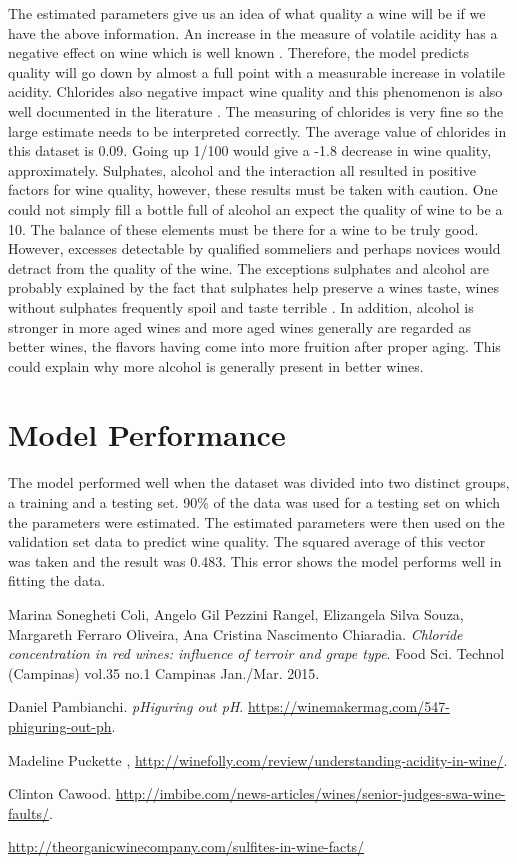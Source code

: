 \documentclass[]{article}
\begin{document}
The estimated parameters give us an idea of what quality a wine will be if we have the above information. An increase in the measure of volatile acidity has a negative effect on wine which is well known \cite{imbibe}. Therefore, the model predicts quality will go down by almost a full point with a measurable increase in volatile acidity. Chlorides also negative impact wine quality and this phenomenon is also well documented in the literature \cite{winSite}. The measuring of chlorides is very fine so the large estimate needs to be interpreted correctly. The average value of chlorides in this dataset is 0.09. Going up 1/100 would give a -1.8 decrease in wine quality, approximately. Sulphates, alcohol and the interaction all resulted in positive factors for wine quality, however, these results must be taken with caution. One could not simply fill a bottle full of alcohol an expect the quality of wine to be a 10. The balance of these elements must be there for a wine to be truly good. However, excesses detectable by qualified sommeliers and perhaps novices would detract from the quality of the wine. The exceptions sulphates and alcohol are probably explained by the fact that sulphates help preserve a wines taste, wines without sulphates frequently spoil and taste terrible \cite{orgainicwine}. In addition, alcohol is stronger in more aged wines and more aged wines generally are regarded as better wines, the flavors having come into more fruition after proper aging. This could explain why more alcohol is generally present in better wines. 

\section*{Model Performance}
The model performed well when the dataset was divided into two distinct groups, a training and a testing set. 90\% of the data was used for a testing set on which the parameters were estimated. The estimated parameters were then used on the validation set data to predict wine quality. The squared average of this vector was taken and the result was 0.483. This error shows the model performs well in fitting the data.

\begin{thebibliography}{9}
	Marina Sonegheti Coli, Angelo Gil Pezzini Rangel, Elizangela Silva Souza, Margareth Ferraro Oliveira, Ana Cristina Nascimento Chiaradia. 
	\textit{Chloride concentration in red wines: influence of terroir and grape type}. 
	Food Sci. Technol (Campinas) vol.35 no.1 Campinas Jan./Mar. 2015.
	
	Daniel Pambianchi. 
	\textit{pHiguring out pH}. 
	\url{https://winemakermag.com/547-phiguring-out-ph}.
	
	Madeline Puckette ,
	\url{http://winefolly.com/review/understanding-acidity-in-wine/}.
	
	Clinton Cawood. \url{http://imbibe.com/news-articles/wines/senior-judges-swa-wine-faults/}.
	
	\url{http://theorganicwinecompany.com/sulfites-in-wine-facts/}
\end{thebibliography}
\end{document}
